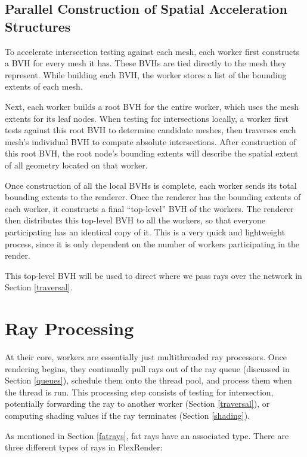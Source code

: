 \documentclass[12pt]{ucthesis}
\begin{document}
\subsection{Parallel Construction of Spatial Acceleration Structures}
\label{parallelbvh}

To accelerate intersection testing against each mesh, each worker first
constructs a BVH for every mesh it has. These BVHs are tied directly to the mesh
they represent. While building each BVH, the worker stores a list of the bounding
extents of each mesh.

Next, each worker builds a root BVH for the entire worker, which uses the mesh
extents for its leaf nodes. When testing for intersections locally, a worker
first tests against this root BVH to determine candidate meshes, then traverses
each mesh's individual BVH to compute absolute intersections. After construction
of this root BVH, the root node's bounding extents will describe the spatial
extent of all geometry located on that worker.

Once construction of all the local BVHs is complete, each worker sends its
total bounding extents to the renderer. Once the renderer has the bounding
extents of each worker, it constructs a final ``top-level'' BVH of the workers.
The renderer then distributes this top-level BVH to all the workers, so that
everyone participating has an identical copy of it. This is a very quick and
lightweight process, since it is only dependent on the number of workers
participating in the render.

This top-level BVH will be used to direct where we pass rays over the network
in Section \ref{traversal}.

\section{Ray Processing}
\label{process}

At their core, workers are essentially just multithreaded ray processors. Once
rendering begins, they continually pull rays out of the ray queue (discussed in
Section \ref{queues}), schedule them onto the thread pool, and process them
when the thread is run. This processing step consists of testing for intersection,
potentially forwarding the ray to another worker (Section \ref{traversal}),
or computing shading values if the ray terminates (Section \ref{shading}).

As mentioned in Section \ref{fatrays}, fat rays have an associated type. There
are three different types of rays in FlexRender:
\end{document}
